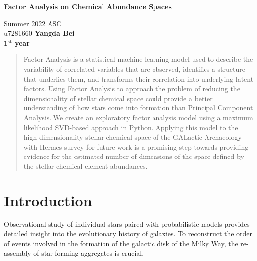 \documentclass[12pt, letterpaper]{article}
\begin{document}
\begin{titlepage}
   \begin{center}
       \vspace*{1cm}

       \textbf{Factor Analysis on Chemical Abundance Spaces}

       \vspace{0.5cm}
        Summer 2022 ASC \\
        u7281660
       \vspace{1.5cm}
       \textbf{Yangda Bei \\
       1$^{\text{st}}$ year}
       \vfill
       \vspace{0.8cm}
   \end{center}
\end{titlepage}

\begin{abstract}
    Factor Analysis is a statistical machine learning model used to describe the variability of correlated variables that are observed, identifies a structure that underlies them, and transforms their correlation into underlying latent factors. 
    Using Factor Analysis to approach the problem of reducing the dimensionality of stellar chemical space could provide a better understanding of how stars come into formation than Principal Component Analysis. We create an exploratory factor analysis model using a maximum likelihood SVD-based approach in Python. Applying this model to the high-dimensionality stellar chemical space of the GALactic Archaeology with Hermes survey for future work is a promising step towards providing evidence for the estimated number of dimensions of the space defined by the stellar chemical element abundances.
\end{abstract}

\pagebreak

\tableofcontents

\pagebreak

\section{Introduction}

Observational study of individual stars paired with probabilistic models provides detailed insight into the evolutionary history of galaxies. To reconstruct the order of events involved in the formation of the galactic disk of the Milky Way, the re-assembly of star-forming aggregates is crucial.
\end{document}

